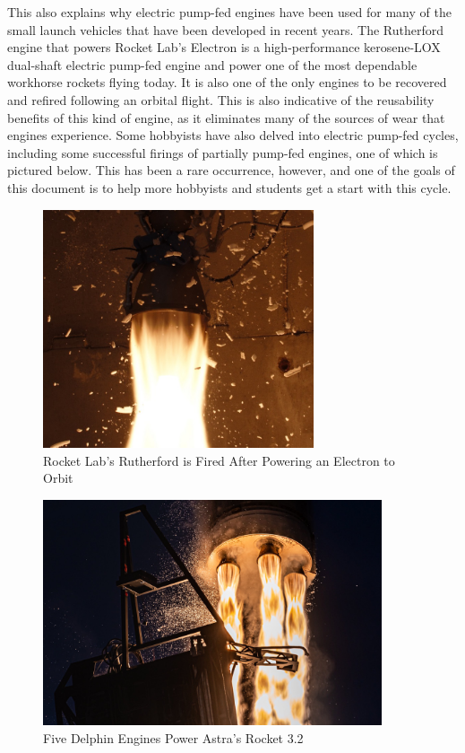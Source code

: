 \documentclass[12pt, letterpaper]{article}
\begin{document}
This also explains why electric pump-fed engines have been used for many of the small launch vehicles that have been developed in recent years. The Rutherford engine that powers Rocket Lab's Electron is a high-performance kerosene-LOX dual-shaft electric pump-fed engine and power one of the most dependable workhorse rockets flying today. It is also one of the only engines to be recovered and refired following an orbital flight. This is also indicative of the reusability benefits of this kind of engine, as it eliminates many of the sources of wear that engines experience. Some hobbyists have also delved into electric pump-fed cycles, including some successful firings of partially pump-fed engines, one of which is pictured below. This has been a rare occurrence, however, and one of the goals of this document is to help more hobbyists and students get a start with this cycle.

\begin{figure}[]
    \centering
    \includegraphics[width=8cm]{Rutherford-Ignition3.jpg}
    \caption{Rocket Lab's Rutherford is Fired After Powering an Electron to Orbit}
\end{figure}

\begin{figure}[]
    \centering
    \includegraphics[width=10cm]{AstraLaunch.jpg}
    \caption{Five Delphin Engines Power Astra's Rocket 3.2}
\end{figure}
\end{document}
